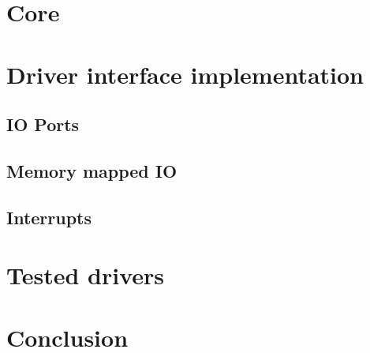 \documentclass[
a4paper,
12pt,
notitlepage,
parskip=half,
DIV=11,
]{scrartcl}
\begin{document}
\section{Core}
\section{Driver interface implementation}
	\subsection{IO Ports}
	\subsection{Memory mapped IO}
	\subsection{Interrupts}
\section{Tested drivers}
\section{Conclusion}
\end{document}
